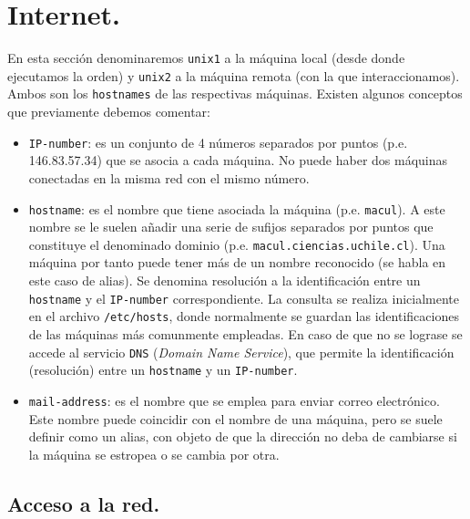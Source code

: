 \section{Internet.}
 
En esta secci{\'o}n denominaremos \verb+unix1+ a la m{\'a}quina local (desde
donde ejecutamos la orden) y \verb+unix2+ a la m{\'a}quina remota (con la que
interaccionamos). Ambos son los \verb+hostnames+ de las respectivas
m{\'a}quinas. Existen algunos conceptos que previamente debemos comentar:

\begin{itemize}
  
\item \verb+IP-number+: es un conjunto de 4 n{\'u}meros separados por
  puntos (p.e.  146.83.57.34) que se asocia a cada m{\'a}quina. No puede
  haber dos m{\'a}quinas conectadas en la misma red con el mismo
  n{\'u}mero.
  
\item \verb+hostname+: es el nombre que tiene asociada la m{\'a}quina
  (p.e. \verb+macul+). A este nombre se le suelen a{\~n}adir una serie de
  sufijos separados por puntos que constituye el denominado dominio
  (p.e. \verb+macul.ciencias.uchile.cl+). Una m{\'a}quina por tanto puede
  tener m{\'a}s de un nombre reconocido (se habla en este caso de alias).
  Se denomina resoluci{\'o}n a la identificaci{\'o}n entre un \verb+hostname+
  y el \verb+IP-number+ correspondiente. La consulta se realiza
  inicialmente en el archivo \verb+/etc/hosts+, donde normalmente se
  guardan las identificaciones de las m{\'a}quinas m{\'a}s comunmente
  empleadas. En caso de que no se lograse se accede al servicio
  \verb+DNS+ ({\it Domain Name Service}), que permite la
  identificaci{\'o}n (resoluci{\'o}n) entre un \verb+hostname+ y un
  \verb+IP-number+.  

\item \verb+mail-address+: es el nombre que se emplea para enviar
  correo electr{\'o}nico. Este nombre puede coincidir con el nombre de
  una m{\'a}quina, pero se suele definir como un alias, con objeto de
  que la direcci{\'o}n no deba de cambiarse si la m{\'a}quina se estropea o se
  cambia por otra.

\end{itemize}


\subsection{Acceso a la red.}

